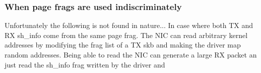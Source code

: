 \subsubsection{When page frags are used indiscriminately}
Unfortunately the following is not found in nature...\newline
In case where both TX and RX sh\_info come from the same page frag. The NIC can read arbitrary kernel addresses by modifying the frag list of a TX skb and making the driver map random addresses.
Being able to read the NIC can generate a large RX packet an just read the sh\_info frag written by the driver and 